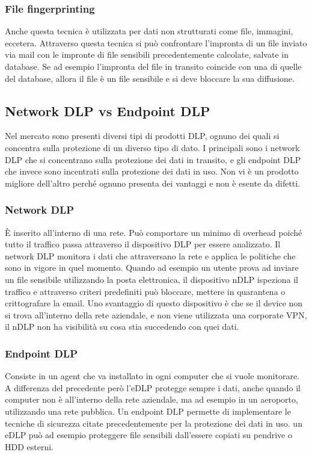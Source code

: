     \subsubsection{File fingerprinting}
    Anche questa tecnica è utilizzata per dati non strutturati come file, immagini, eccetera.
    Attraverso questa tecnica si può confrontare l'impronta di un file inviato via mail con 
    le impronte di file sensibili precedentemente calcolate, salvate in database.
    Se ad esempio l'impronta del file in transito coincide con una di quelle del database,
    allora il file è un file sensibile e si deve bloccare la sua diffusione.

\subsection{Network DLP vs Endpoint DLP}
    Nel mercato sono presenti diversi tipi di prodotti DLP, ognuno dei quali si concentra sulla protezione
    di un diverso tipo di dato. I principali sono i network DLP che si concentrano sulla protezione dei dati
    in transito, e gli endpoint DLP che invece sono incentrati sulla protezione dei dati in uso.
    Non vi è un prodotto migliore dell'altro perché ognuno presenta dei vantaggi e non è esente da difetti.

    \subsubsection{Network DLP}
            È inserito all'interno di una rete. Può comportare un minimo di overhead poiché tutto il traffico
            passa attraverso il dispositivo DLP per essere analizzato.
            Il network DLP monitora i dati che attraversano la rete e applica le politiche che sono in vigore
            in quel momento. Quando ad esempio un utente prova ad inviare un file sensibile utilizzando la posta
            elettronica, il  dispositivo nDLP ispeziona il traffico e attraverso criteri predefiniti 
            può bloccare, mettere in quarantena o crittografare la email.
            Uno svantaggio di questo dispositivo è che se il device non si trova all'interno della rete aziendale,
            e non viene utilizzata una corporate VPN, il nDLP non ha visibilità su cosa stia succedendo con quei 
            dati.

    \subsubsection{Endpoint DLP}
            Consiste in un agent che va installato in ogni computer che si vuole monitorare. A differenza del precedente 
            però l'eDLP protegge sempre i dati, anche quando il computer non è all'interno della rete aziendale, ma ad esempio in un 
            aeroporto, utilizzando una rete pubblica. Un endpoint DLP permette di implementare le tecniche di sicurezza
            citate precedentemente per la protezione dei dati in uso. un eDLP può ad esempio proteggere file sensibili 
            dall'essere copiati su pendrive o HDD esterni.
    
